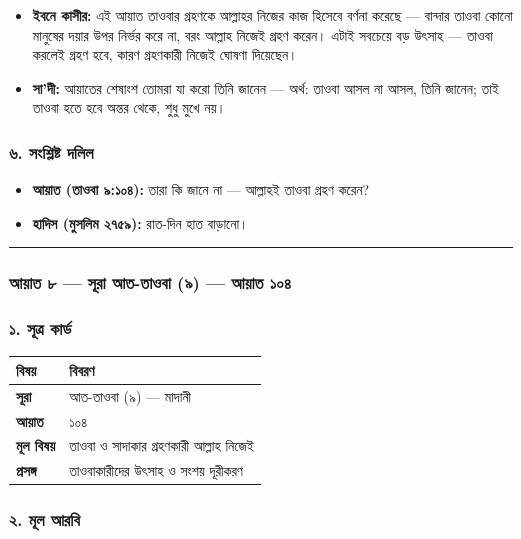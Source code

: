 \begin{itemize}
\item \textbf{ইবনে কাসীর:} এই আয়াত তাওবার গ্রহণকে আল্লাহর নিজের কাজ হিসেবে বর্ণনা করেছে — বান্দার তাওবা কোনো মানুষের দয়ার উপর নির্ভর করে না, বরং আল্লাহ নিজেই গ্রহণ করেন। এটাই সবচেয়ে বড় উৎসাহ — তাওবা করলেই গ্রহণ হবে, কারণ গ্রহণকারী নিজেই ঘোষণা দিয়েছেন।
\item \textbf{সা'দী:} আয়াতের শেষাংশ তোমরা যা করো তিনি জানেন — অর্থ: তাওবা আসল না আসল, তিনি জানেন; তাই তাওবা হতে হবে অন্তর থেকে, শুধু মুখে নয়।
\end{itemize}
\subsubsection*{৬. সংশ্লিষ্ট দলিল}

\begin{itemize}
\item \textbf{আয়াত (তাওবা ৯:১০৪):} তারা কি জানে না — আল্লাহই তাওবা গ্রহণ করেন?
\item \textbf{হাদিস (মুসলিম ২৭৫৯):} রাত-দিন হাত বাড়ানো।
\end{itemize}
\medskip\hrule\medskip

\subsubsection*{আয়াত ৮ — সূরা আত-তাওবা (৯) — আয়াত ১০৪}

\subsubsection*{১. সূত্র কার্ড}

\begin{table}[h]\centering\small
\begin{tabular}{ll}
বিষয় & বিবরণ \\
\hline
\textbf{সূরা} & আত-তাওবা (৯) — মাদানী \\
\textbf{আয়াত} & ১০৪ \\
\textbf{মূল বিষয়} & তাওবা ও সাদাকার গ্রহণকারী আল্লাহ নিজেই \\
\textbf{প্রসঙ্গ} & তাওবাকারীদের উৎসাহ ও সংশয় দূরীকরণ \\
\hline
\end{tabular}
\end{table}

\subsubsection*{২. মূল আরবি}

